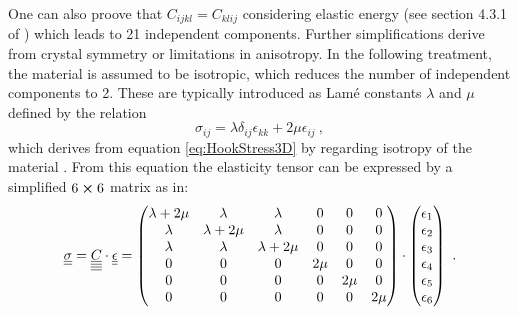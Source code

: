 One can also proove that $C_{ijkl} = C_{klij}$ considering elastic energy (see
section 4.3.1 of \cite{GrossMarx2014}) which leads to 21 independent
components. Further simplifications derive from crystal symmetry or
limitations in anisotropy. In the following treatment, the material is assumed
to be isotropic, which reduces the number of independent components to 2. These
are typically introduced as Lamé constants $\lambda$ and $\mu$ defined by the
relation
\begin{equation} \label{eq:StressStrainIso_tensor}
    \sigma_{ij} = \lambda \delta_{ij} \epsilon_{kk} + 2\mu \epsilon_{ij}\ ,
\end{equation}
which derives from equation \ref{eq:HookStress3D} by regarding isotropy of the
material \cite{kundu2012ultrasonic}. From this equation the elasticity tensor
can be expressed by a simplified $6\cross6$ matrix as in:
\begin{equation} \label{eq:StressStrainIso}
    \underline{\underline{\sigma}} = \underline{\underline{\underline{\underline{C}}}}\cdot \underline{\underline{\epsilon}} =
    \begin{pmatrix}
        \lambda + 2\mu & \lambda        & \lambda        & 0    & 0    & 0
        \\
        \lambda        & \lambda + 2\mu & \lambda        & 0    & 0    & 0
        \\
        \lambda        & \lambda        & \lambda + 2\mu & 0    & 0    & 0
        \\
        0              & 0              & 0              & 2\mu & 0    & 0
        \\
        0              & 0              & 0              & 0    & 2\mu & 0
        \\
        0              & 0              & 0              & 0    & 0    & 2\mu
        \\
    \end{pmatrix}
    \cdot
    \begin{pmatrix}
        \epsilon_1 \\ \epsilon_2 \\ \epsilon_3 \\ \epsilon_4 \\ \epsilon_5 \\
        \epsilon_6 \\
    \end{pmatrix} \ .
\end{equation}


